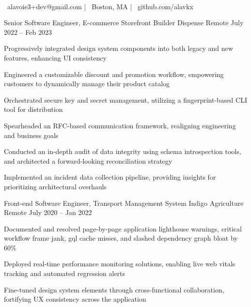 \documentclass[]{awesome-cv}
\begin{document}
    
\begin{center}
	  \\
	\vspace{2mm}
	{\faEnvelope\ alavoie3+dev@gmail.com} | {\faMapMarker\ Boston, MA} | {\faLink\ github.com/alavkx}
\end{center}

\begin{cventries}
	\cventry
	{Senior Software Engineer, E-commerce Storefront Builder}
	{Dispense}
	{Remote}
	{July 2022 – Feb 2023}
	{\begin{cvitems}
		\item {Progressively integrated design system components into both legacy and new features, enhancing UI consistency}
		\item {Engineered a customizable discount and promotion workflow, empowering customers to dynamically manage their product catalog}
		\item {Orchestrated secure key and secret management, utilizing a fingerprint-based CLI tool for distribution}
		\item {Spearheaded an RFC-based communication framework, realigning engineering and business goals}
		\item {Conducted an in-depth audit of data integrity using schema introspection tools, and architected a forward-looking reconciliation strategy}
		\item {Implemented an incident data collection pipeline, providing insights for prioritizing architectural overhauls}
		\end{cvitems}}
	\cventry
	{Front-end Software Engineer, Transport Management System}
	{Indigo Agriculture}
	{Remote}
	{July 2020 – Jan 2022}
	{\begin{cvitems}
		\item {Documented and resolved page-by-page application lighthouse warnings, critical workflow frame jank, gql cache misses, and slashed dependency graph bloat by 60\%}
		\item {Deployed real-time performance monitoring solutions, enabling live web vitals tracking and automated regression alerts}
		\item {Fine-tuned design system elements through cross-functional collaboration, fortifying UX consistency across the application}

\end{cvitems}}
\end{cventries}
\end{document}
